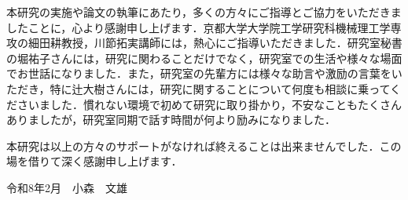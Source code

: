 \acknowledgment

本研究の実施や論文の執筆にあたり，多くの方々にご指導とご協力をいただきましたことに，心より感謝申し上げます．京都大学大学院工学研究科機械理工学専攻の細田耕教授，川節拓実講師には，熱心にご指導いただきました．研究室秘書の堀祐子さんには，研究に関わることだけでなく，研究室での生活や様々な場面でお世話になりました．また，研究室の先輩方には様々な助言や激励の言葉をいただき，特に辻大樹さんには，研究に関することについて何度も相談に乗ってくださいました．慣れない環境で初めて研究に取り掛かり，不安なこともたくさんありましたが，研究室同期で話す時間が何より励みになりました．

本研究は以上の方々のサポートがなければ終えることは出来ませんでした．この場を借りて深く感謝申し上げます．

\begin{flushright}
令和8年2月　小森　文雄
\end{flushright}
